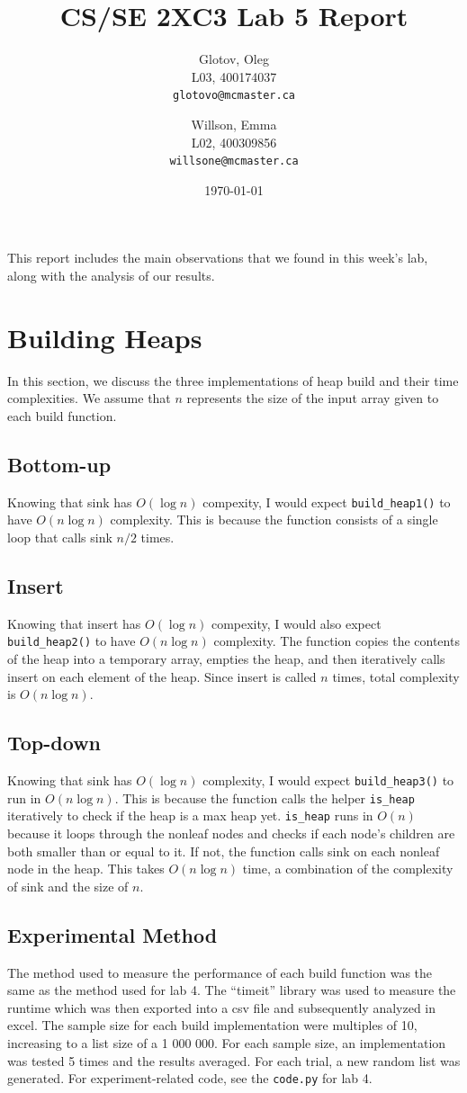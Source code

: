 \documentclass[12pt]{article}
\title{CS/SE 2XC3 Lab 5 Report}
\author{
  Glotov, Oleg\\ L03, 400174037\\
  \texttt{glotovo@mcmaster.ca}
  \and
  Willson, Emma\\ L02, 400309856\\
  \texttt{willsone@mcmaster.ca}
  }
\date{\today}
\begin{document}
\maketitle

This report includes the main observations that we found in this week's lab, along with the analysis of our results.

\newpage 
\section{Building Heaps}
In this section, we discuss the three implementations of heap build and their time complexities. We assume that $n$ represents the size of the input array given to each build function.
\subsection{Bottom-up}
Knowing that sink has $O(\log{n})$ compexity, I would expect \verb+build_heap1()+ to have $O(n\log{n})$ complexity. This is because the function consists of a single loop that calls sink $n/2$ times. 
\subsection{Insert}
Knowing that insert has $O(\log{n})$ compexity, I would also expect \verb+build_heap2()+ to have $O(n\log{n})$ complexity. The function copies the contents of the heap into a temporary array, empties the heap, and then iteratively calls insert on each element of the heap. Since insert is called $n$ times, total complexity is $O(n\log{n})$.
\subsection{Top-down}
Knowing that sink has $O(\log{n})$ complexity, I would expect \verb+build_heap3()+ to run in $O(n\log{n})$. This is because the function calls the helper \verb+is_heap+ iteratively to check if the heap is a max heap yet. \verb+is_heap+ runs in $O(n)$ because it loops through the nonleaf nodes and checks if each node's children are both smaller than or equal to it. If not, the function calls sink on each nonleaf node in the heap. This takes $O(n\log{n})$ time, a combination of the complexity of sink and the size of $n$. 
\subsection{Experimental Method}
The method used to measure the performance of each build function was the same as the method used for lab 4. The “timeit” library was used to measure the runtime which was then exported into a csv file and subsequently analyzed in excel. The sample size for each build implementation were multiples of 10, increasing to a list size of a 1 000 000. For each sample size, an implementation was tested 5 times and the results averaged. For each trial, a new random list was generated. For experiment-related code, see the \verb+code.py+ for lab 4.
\end{document}
